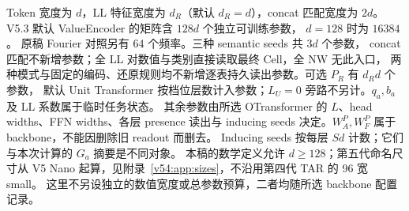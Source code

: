 \documentclass[11pt,UTF8,fontset=fandol]{ctexart}
\numberwithin{equation}{section}
\theoremstyle{definition}
\begin{document}
Token 宽度为 $d$，LL 特征宽度为 $d_R$（默认 $d_R=d$），concat 匹配宽度为 $2d$。
V5.3 默认 ValueEncoder 的矩阵含 $128d$ 个独立可训练参数，
$d=128$ 时为 $16384$。
原稿 Fourier 对照另有 64 个频率。三种 semantic seeds 共 $3d$ 个参数，
concat 匹配不新增参数；全 LL 对数值与类别直接读取最终 Cell，全 NW 无此入口，
两种模式与固定的编码、还原规则均不新增逐表持久读出参数。可选 $P_R$ 有 $d_Rd$ 个参数，
默认 Unit Transformer 按档位层数计入参数；$L_U=0$ 旁路不另计。$q_a,b_a$ 及 LL 系数属于临时任务状态。
其余参数由所选 OTransformer 的 $L$、head widths、FFN widths、各层 presence 读出与
inducing seeds 决定。$W_A^P,W_F^P$ 属于 backbone，不能因删除旧 readout 而删去。
Inducing seeds 按每层 $Sd$ 计数；它们与本次计算的 $G_a$ 摘要是不同对象。
本稿的数学定义允许 $d\ge128$；第五代命名尺寸从 V5 Nano 起算，见附录~\ref{v54:app:sizes}，不沿用第四代 TAR 的 96 宽 small。
这里不另设独立的数值宽度或总参数预算，二者均随所选 backbone 配置记录。
\end{document}
